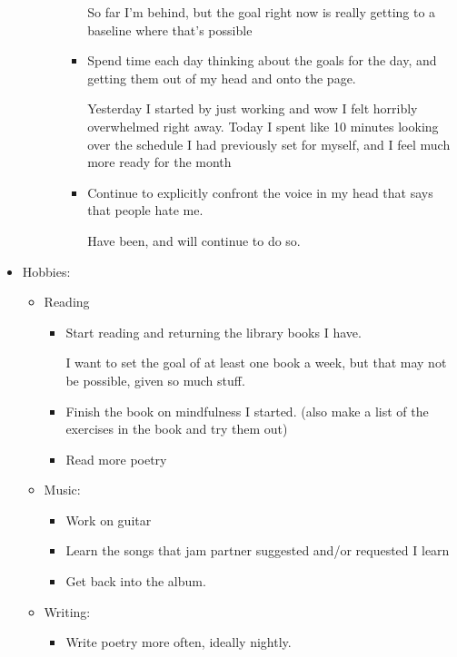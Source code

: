 \documentclass[12pt]{article}[titlepage]
\renewcommand{\,}{\textsuperscript{,}}
\begin{document}
\begin{itemize}
\begin{itemize}
\begin{itemize}
\begin{itemize}
So far I'm behind, but the goal right now is really getting to a baseline where that's possible  
\item Spend time each day thinking about the goals for the day, and getting them out of my head and onto the page.

Yesterday I started by just working and wow I felt horribly overwhelmed right away. Today I spent like 10 minutes looking over the schedule I had previously set for myself, and I feel much more ready for the month  
\item Continue to explicitly confront the voice in my head that says that people hate me.

Have been, and will continue to do so.  
\end{itemize}   
\end{itemize}  
\end{itemize}   
\item Hobbies:   
\begin{itemize}   
\item Reading  
\begin{itemize}  
\item Start reading and returning the library books I have.

I want to set the goal of at least one book a week, but that may not be possible, given so much stuff.  
\item Finish the book on mindfulness I started. (also make a list of the exercises in the book and try them out)  
\item Read more poetry  
\end{itemize}

\item Music:   
\begin{itemize}   
\item Work on guitar  
\item Learn the songs that jam partner suggested and/or requested I learn  
\item Get back into the album.  
\end{itemize}   
\item Writing:  
\begin{itemize}   
\item Write poetry more often, ideally nightly.


\end{itemize}
\end{itemize}
\end{itemize}
\end{document}
